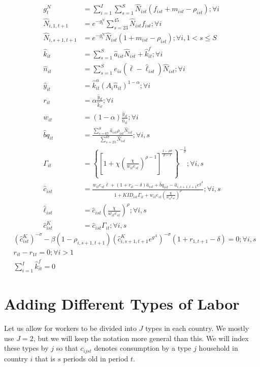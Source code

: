 \documentclass[letterpaper,12pt]{article}
\theoremstyle{definition}
\numberwithin{equation}{section}
\begin{document}
\begin{spacing}{1.5}
	\begin{align}
		g^N_t & = \sum_{i=1}^I \sum_{s=1}^S \hat N_{ist} (f_{ist}+m_{ist}-\rho_{ist}) ; \forall i \label{eq_4gNdef}\\
		\hat N_{i,1,t+1} & = e^{-g^N_t}\sum_{s=23}^{45} \hat N_{ist} f_{ist} ; \forall i\\
		\hat N_{i,s+1,t+1} & = e^{-g^N_t}\hat N_{ist} (1+m_{ist}-\rho_{ist}); \forall i, 1<s\le S \label{eq_4pop2} \\
		\hat k_{it} & = \sum_{s=1}^S \hat a_{ist} \hat N_{ist} + \hat k_{it}^f; \forall i \\
		\hat n_{it} & = \sum_{s=1}^S e_{is} (\bar \ell - \hat \ell_{ist}) \hat N_{ist}; \forall i \\
		\hat y_{it} & = \hat k_{it}^\alpha \left( A_{i} \hat n_{it} \right)^{1-\alpha} ; \forall i \\
		r_{it} & = \alpha \frac{\hat y_{it}}{\hat k_{it}}; \forall i \\
		w_{it} & = (1-\alpha) \frac{\hat y_{it}}{\hat n_{it}}; \forall i \\
		\hat bq_{it} & = \frac{\sum_{s=67}^S \hat a_{ist} \rho_{ist} \hat N_{ist}}{\sum_{s=23}^{67} \hat N_{ist}} ; \forall i,s \\
		\Gamma_{it} & = \left\{ \left[1 + \chi \left(\frac{\chi}{w_{it} e_{st}}\right)^{\rho-1}\right]^{\tfrac{1-\rho \sigma}{\rho-1}}  \right\}^{-\tfrac{1}{\sigma}}; \forall i,s \\
    	\hat c_{ist} & = \frac{w_{it} e_{st} \bar \ell + (1+r_{it}-\delta)\hat a_{ist} +\hat bq_{ist} - \hat a_{i,s+1,t+1} e^{g^A}} {1 + KID_{ist}\Gamma_{it} +w_{it}e_{st} \left(\tfrac{\chi}{w_{it}e_{st}}\right)^\rho}; \forall i,s \\
		\hat \ell_{ist} & = \hat c_{ist} \left(\frac{\chi}{w_{it}e_{st}}\right)^\rho ; \forall i,s \\
		\hat c^K_{ist} & = \hat c_{ist} \Gamma_{it}; \forall i,s
	\end{align}
	\begin{align}
		& \left({\hat c^K_{ist}}\right)^{-\sigma} - \beta (1-\rho_{i,s+1,t+1}) \left(\hat c^K_{i,s+1,t+1} e^{g^A}\right)^{-\sigma}(1+r_{1,t+1}-\delta) = 0; \forall i,s \\
		& r_{it} - r_{1t} = 0; \forall i>1 \\
		& \sum_{i=1}^I \hat k^f_{it} = 0
	\end{align}


\newpage
\section{Adding Different Types of Labor}
	Let us allow for workers to be divided into $J$ types in each country.  We mostly use $J=2$, but we will keep the notation more general than this.  We will index these types by $j$ so that $c_{ijst}$ denotes consumption by a type $j$ household in country $i$ that is $s$ periods old in period $t$.


\end{spacing}
\end{document}
